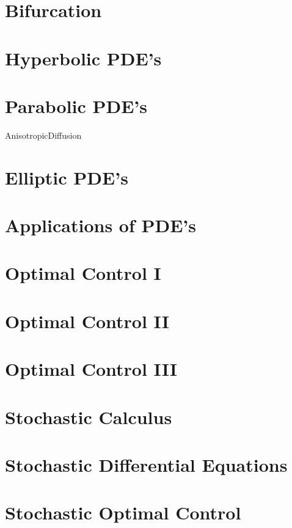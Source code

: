 \documentclass[nociteref]{newsiambook}
\begin{document}
\part{Bifurcation}

\part{Hyperbolic PDE's}

\part{Parabolic PDE's}
{AnisotropicDiffusion}

\part{Elliptic PDE's}

\part{Applications of PDE's}

\part{Optimal Control I}

\part{Optimal Control II}

\part{Optimal Control III}

\part{Stochastic Calculus}

\part{Stochastic Differential Equations}

\part{Stochastic Optimal Control}
\end{document}
